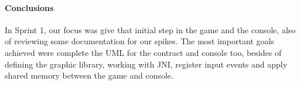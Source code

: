 \paragraph{Conclusions}

In Sprint 1, our focus was give that initial step in the game and the console, 
also of reviewing some documentation for our spikes. The most important goals
achieved were complete the UML for the contract and console too, besides of 
defining the graphic library, working with JNI, register input events and apply 
shared memory between the game and console.

